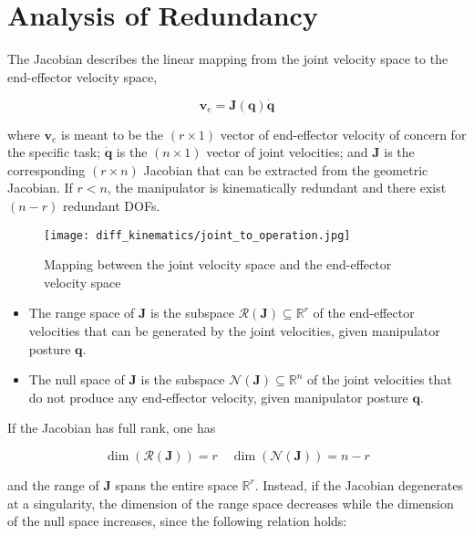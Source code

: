 \documentclass[10pt]{article}
\begin{document}
\section{Analysis of Redundancy}


The Jacobian describes the linear mapping from the joint velocity space to the end-effector velocity space, 

$$
\boldsymbol{v}_{e}=\boldsymbol{J}(\boldsymbol{q}) \dot{\boldsymbol{q}}
$$

where  $\boldsymbol{v}_{e}$ is meant to be the $(r \times 1)$ vector of end-effector velocity of concern for the specific task; $\dot{\boldsymbol{q}}$ is the $(n \times 1)$ vector of joint velocities; and $\boldsymbol{J}$ is the corresponding $(r \times n)$ Jacobian  that can be extracted from the geometric Jacobian. If $r<n$, the manipulator is kinematically redundant and there exist $(n-r)$ redundant DOFs.

\begin{figure}
    \centering
    \texttt{[image: diff\_kinematics/joint\_to\_operation.jpg]}
    \caption{Mapping between the joint velocity space and the end-effector velocity space}
    \label{fig:enter-label}
\end{figure}

\begin{itemize}
  \item The range space of $\boldsymbol{J}$ is the subspace $\mathcal{R}(\boldsymbol{J})\subseteq \mathbb{R}^r$ of the end-effector velocities that can be generated by the joint velocities, given manipulator posture $\boldsymbol{q}$.

  \item The null space of $\boldsymbol{J}$ is the subspace $\mathcal{N}(\boldsymbol{J})\subseteq \mathbb{R}^n$  of the joint velocities that do not produce any end-effector velocity, given manipulator posture $\boldsymbol{q}$.

\end{itemize}

If the Jacobian has full rank, one has

$$
\operatorname{dim}(\mathcal{R}(\boldsymbol{J}))=r \quad \operatorname{dim}(\mathcal{N}(\boldsymbol{J}))=n-r
$$

and the range of $\boldsymbol{J}$ spans the entire space $\mathbb{R}^{r}$. Instead, if the Jacobian degenerates at a singularity, the dimension of the range space decreases while the dimension of the null space increases, since the following relation holds:
\end{document}
